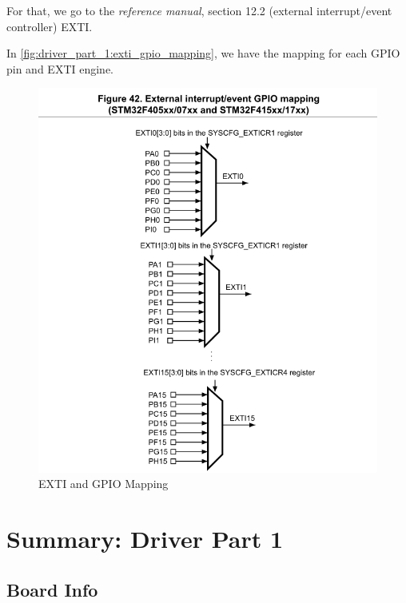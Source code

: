 For that, we go to the \textit{reference manual}, section 12.2 (external interrupt/event controller) EXTI.

In \autoref{fig:driver_part_1:exti_gpio_mapping}, we have the mapping for each GPIO pin and EXTI engine. 

\begin{figure}[h]
\centering
\includegraphics[scale=0.5]{Figures/driver_part_1/exti_gpio_mapping}
\caption{EXTI and GPIO Mapping}
\label{fig:driver_part_1:exti_gpio_mapping}
\end{figure}


\newpage
\section{Summary: Driver Part 1}

\subsection{Board Info}

